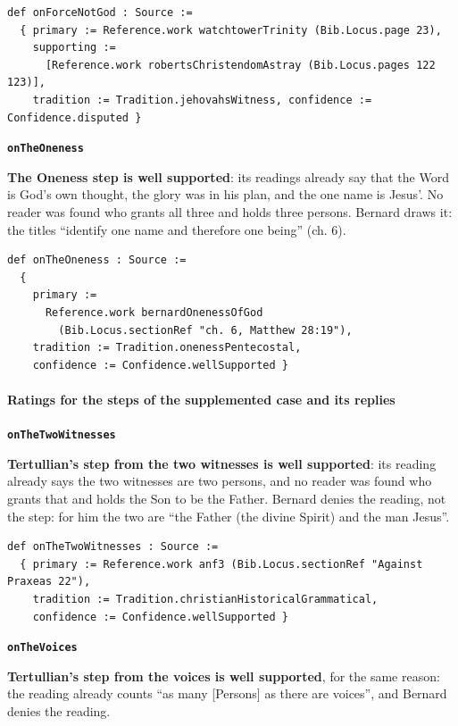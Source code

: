 \documentclass[11pt,paper=\testimonypaper,DIV=13,parskip=false]{scrartcl}
\begin{document}
{\small\begin{verbatim}
def onForceNotGod : Source :=
  { primary := Reference.work watchtowerTrinity (Bib.Locus.page 23),
    supporting :=
      [Reference.work robertsChristendomAstray (Bib.Locus.pages 122 123)],
    tradition := Tradition.jehovahsWitness, confidence := Confidence.disputed }
\end{verbatim}}
\par\medskip\noindent\textbf{\texttt{on\allowbreak{}The\allowbreak{}Oneness}}\par\nobreak\noindent
\textbf{The Oneness step is well supported}: its readings already say that the Word is God’s own thought, the glory was in his plan, and the one name is Jesus’. No reader was found who grants all three and holds three persons. Bernard draws it: the titles “identify one name and therefore one being” (ch. 6).

{\small\begin{verbatim}
def onTheOneness : Source :=
  {
    primary :=
      Reference.work bernardOnenessOfGod
        (Bib.Locus.sectionRef "ch. 6, Matthew 28:19"),
    tradition := Tradition.onenessPentecostal,
    confidence := Confidence.wellSupported }
\end{verbatim}}
\paragraph*{Ratings for the steps of the supplemented case and its replies}
\leavevmode\par\nobreak
\par\medskip\noindent\textbf{\texttt{on\allowbreak{}The\allowbreak{}Two\allowbreak{}Witnesses}}\par\nobreak\noindent
\textbf{Tertullian’s step from the two witnesses is well supported}: its reading already says the two witnesses are two persons, and no reader was found who grants that and holds the Son to be the Father. Bernard denies the reading, not the step: for him the two are “the Father (the divine Spirit) and the man Jesus”.

{\small\begin{verbatim}
def onTheTwoWitnesses : Source :=
  { primary := Reference.work anf3 (Bib.Locus.sectionRef "Against Praxeas 22"),
    tradition := Tradition.christianHistoricalGrammatical,
    confidence := Confidence.wellSupported }
\end{verbatim}}
\par\medskip\noindent\textbf{\texttt{on\allowbreak{}The\allowbreak{}Voices}}\par\nobreak\noindent
\textbf{Tertullian’s step from the voices is well supported}, for the same reason: the reading already counts “as many [Persons] as there are voices”, and Bernard denies the reading.
\end{document}
